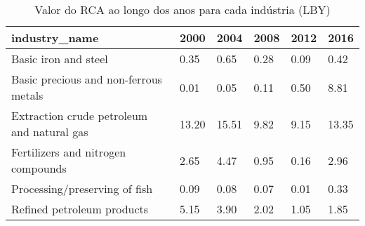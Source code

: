 \begin{table}
\centering
\caption{Valor do RCA ao longo dos anos para cada indústria (LBY)}
\begin{tabular}{p{6cm}p{1.5cm}p{1.5cm}p{1.5cm}p{1.5cm}p{1.5cm}}
\toprule
                             industry\_name &  2000 &  2004 & 2008 & 2012 &  2016 \\
\midrule
                      Basic iron and steel &  0.35 &  0.65 & 0.28 & 0.09 &  0.42 \\
     Basic precious and non-ferrous metals &  0.01 &  0.05 & 0.11 & 0.50 &  8.81 \\
Extraction crude petroleum and natural gas & 13.20 & 15.51 & 9.82 & 9.15 & 13.35 \\
        Fertilizers and nitrogen compounds &  2.65 &  4.47 & 0.95 & 0.16 &  2.96 \\
             Processing/preserving of fish &  0.09 &  0.08 & 0.07 & 0.01 &  0.33 \\
                Refined petroleum products &  5.15 &  3.90 & 2.02 & 1.05 &  1.85 \\
\bottomrule
\end{tabular}
\end{table}
